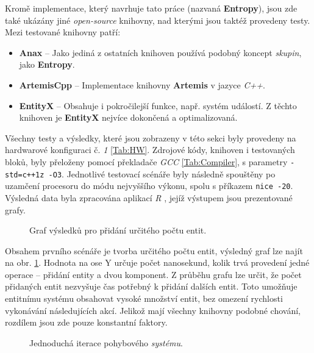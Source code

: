 Kromě implementace, který navrhuje tato práce (nazvaná \textbf{Entropy}), jsou zde také ukázány jiné \emph{open-source} knihovny, nad kterými jsou taktéž provedeny testy. Mezi testované knihovny patří:
\begin{itemize}
	\item \textbf{Anax} \cite{Anax} -- Jako jediná z ostatních knihoven používá podobný koncept \emph{skupin}, jako \textbf{Entropy}.
	\item \textbf{ArtemisCpp} \cite{ArtemisCpp} -- Implementace knihovny \textbf{Artemis} \cite{ArtemisJava} v jazyce \emph{C++}.
	\item \textbf{EntityX} \cite{EntityX} -- Obsahuje i pokročilejší funkce, např. systém událostí. Z těchto knihoven je \textbf{EntityX} nejvíce dokončená a optimalizovaná.
\end{itemize}

Všechny testy a výsledky, které jsou zobrazeny v této sekci byly provedeny na hardwarové konfiguraci č. \emph{1} \ref{Tab:HW}. Zdrojové kódy, knihoven i testovaných bloků, byly přeloženy pomocí překladače \emph{GCC} \ref{Tab:Compiler}, s parametry \texttt{-std=c++1z -O3}. Jednotlivé testovací scénáře byly následně spouštěny po uzamčení procesoru do módu nejvyššího výkonu, spolu s příkazem \texttt{nice -20}. Výsledná data byla zpracována aplikací \emph{R} \cite{RHome}, jejíž výstupem jsou prezentované grafy.

\begin{figure}[H]
	\begin{center}
	\end{center}
	\caption{Graf výsledků pro přidání určitého počtu entit.}
	\label{Fig:EVALEntity}
\end{figure}

Obsahem prvního scénáře je tvorba určitého počtu entit, výsledný graf lze najít na obr. \ref{Fig:EVALEntity}. Hodnota na ose Y určuje počet nanosekund, kolik trvá provedení jedné operace -- přidání entity a dvou komponent. Z průběhu grafu lze určit, že počet přidaných entit nezvyšuje čas potřebný k přidání dalších entit. Toto umožňuje entitnímu systému obsahovat vysoké množství entit, bez omezení rychlosti vykonávání následujících akcí. Jelikož mají všechny knihovny podobné chování, rozdílem jsou zde pouze konstantní faktory.

\begin{figure}[H]
	\begin{center}
	\end{center}
	\caption{Jednoduchá iterace pohybového \emph{systému}.}
	\label{Fig:EVALMovSys}
\end{figure}

